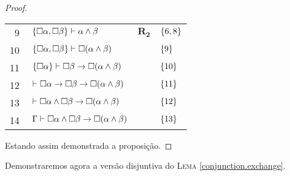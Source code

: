 \begin{tcolorbox}[enhanced jigsaw, breakable, sharp corners, colframe=black, colback=white, boxrule=0.5pt, left=1.5mm, right=1.5mm, top=1.5mm, bottom=1.5mm]
\begin{lemma}
\begin{proof}
\begin{xltabular}{\textwidth}{r | X l l}
            \scriptsize{\phantom{0}9}\phantom{ } & $\ \set{\nec\alpha,\nec\beta}\vdash\alpha\wedge\beta$                  & $\hyperref[modal.rule.2]{\mathbf{R_2}}$        & $\left\{6,8\right\}$\\[\rowskip]
            \scriptsize{10}\phantom{ }           & $\ \set{\nec\alpha,\nec\beta}\vdash\nec(\alpha\wedge\beta)$            & \phantom{1}           & $\left\{9\right\}$\\[\rowskip]
            \scriptsize{11}\phantom{ }           & $\ \set{\nec\alpha}\vdash\nec\beta\to\nec(\alpha\wedge\beta)$          &                            & $\left\{10\right\}$\\[\rowskip]
            \scriptsize{12}\phantom{ }           & $\ \vdash\nec\alpha\to\nec\beta\to\nec(\alpha\wedge\beta)$             &                            & $\left\{11\right\}$\\[\rowskip]
            \scriptsize{13}\phantom{ }           & $\ \vdash\nec\alpha\wedge\nec\beta\to\nec(\alpha\wedge\beta)$          &                          & $\left\{12\right\}$\\[\rowskip]
            \scriptsize{14}\phantom{ }           & $\ \Gamma\vdash\nec\alpha\wedge\nec\beta\to\nec(\alpha\wedge\beta)$    &                            & $\left\{13\right\}$
        \end{xltabular}
        \normalsize

        \vspace{0.5\baselineskip}
        Estando assim demonstrada a proposição.
        \end{proof}
    \end{lemma}
\end{tcolorbox}

\vspace{.5\baselineskip}
Demonstraremos agora a versão disjuntiva do \textsc{Lema} \ref{conjunction.exchange}.

